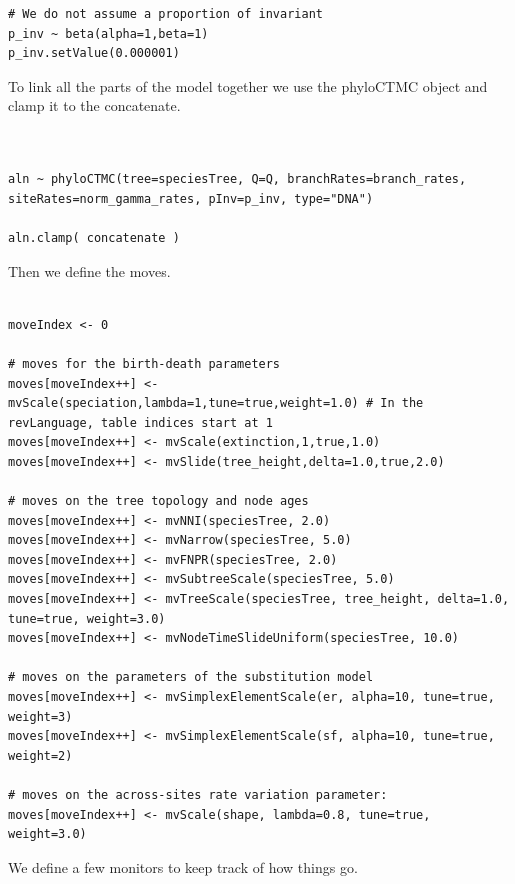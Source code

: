 \documentclass[11pt]{article}
\begin{document}
{\begin{framed}
{\begin{snugshade*}
\begin{lstlisting}
# We do not assume a proportion of invariant
p_inv ~ beta(alpha=1,beta=1)
p_inv.setValue(0.000001)
\end{lstlisting}
\end{snugshade*}}

To link all the parts of the model together we use the phyloCTMC object and clamp it to the concatenate.

 {\tt \begin{snugshade*}
\begin{lstlisting}


aln ~ phyloCTMC(tree=speciesTree, Q=Q, branchRates=branch_rates, siteRates=norm_gamma_rates, pInv=p_inv, type="DNA")

aln.clamp( concatenate )
\end{lstlisting}
\end{snugshade*}}

Then we define the moves.

 {\tt \begin{snugshade*}
\begin{lstlisting}

moveIndex <- 0

# moves for the birth-death parameters
moves[moveIndex++] <- mvScale(speciation,lambda=1,tune=true,weight=1.0) # In the revLanguage, table indices start at 1
moves[moveIndex++] <- mvScale(extinction,1,true,1.0)
moves[moveIndex++] <- mvSlide(tree_height,delta=1.0,true,2.0)

# moves on the tree topology and node ages
moves[moveIndex++] <- mvNNI(speciesTree, 2.0)
moves[moveIndex++] <- mvNarrow(speciesTree, 5.0)
moves[moveIndex++] <- mvFNPR(speciesTree, 2.0)
moves[moveIndex++] <- mvSubtreeScale(speciesTree, 5.0)
moves[moveIndex++] <- mvTreeScale(speciesTree, tree_height, delta=1.0, tune=true, weight=3.0)
moves[moveIndex++] <- mvNodeTimeSlideUniform(speciesTree, 10.0)

# moves on the parameters of the substitution model
moves[moveIndex++] <- mvSimplexElementScale(er, alpha=10, tune=true, weight=3) 
moves[moveIndex++] <- mvSimplexElementScale(sf, alpha=10, tune=true, weight=2) 

# moves on the across-sites rate variation parameter:
moves[moveIndex++] <- mvScale(shape, lambda=0.8, tune=true, weight=3.0)
\end{lstlisting}
\end{snugshade*}}

We define a few monitors to keep track of how things go.
 {\tt \begin{snugshade*}
\begin{lstlisting}


\end{lstlisting}
\end{snugshade*}}
\end{framed}}
\end{document}
